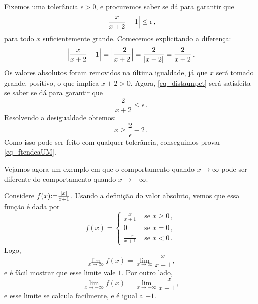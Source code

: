 \begin{ex}
Fixemos uma tolerância 
$\epsilon>0$, e procuremos saber se dá para garantir que 
\begin{equation}\label{eq_distaunpet} 
\Bigl|\frac{x}{x+2}-1\Bigr|\leq \epsilon\,,
\end{equation}
para todo $x$ suficientemente grande.
Comecemos explicitando a diferença:
\begin{equation}\label{eq_calculdifff}\Bigl|\frac{x}{x+2}-1\Bigr|=
\Bigl| \frac{-2}{x+2}\Bigr|=\frac{2}{|x+2|}=\frac{2}{x+2}\,.
\end{equation}
Os valores absolutos foram removidos na última igualdade,
já que $x$ será tomado grande, positivo, o que
implica $x+2>0$.
Agora, \eqref{eq_distaunpet} será satisfeita se
saber se dá para garantir que 
\[ 
\frac{2}{x+2}\leq \epsilon\,.
\]
Resolvendo a desigualdade obtemos: 
\[x\geq \frac{2}{\epsilon}-2\,.\]
Como isso pode ser feito com qualquer tolerância,
conseguimos provar \eqref{eq_ftendeaUM}.
\end{ex}

Vejamos agora um exemplo em que o comportamento quando $x\to\infty$ pode
ser diferente do comportamento quando $x\to-\infty$.

\begin{ex}\label{ex_LIM_deuxassymp}
Considere $f(x){:=} \frac{|x|}{x+1}$.
Usando a definição do valor absoluto, vemos que essa função é dada por
\[ 
f(x)=
\begin{cases}
\frac{x}{x+1}&\text{ se }x\geq 0\,,\\
0&\text{ se }x= 0\,,\\
\frac{-x}{x+1}&\text{ se }x< 0\,.
\end{cases}
\]
Logo,
$$\lim_{x\to \infty}f(x)=\lim_{x\to\infty}\frac{x}{x+1}\,,
$$
e é fácil mostrar que esse limite vale $1$.
Por outro lado,
$$\lim_{x\to -\infty}f(x)=\lim_{x\to-\infty}\frac{-x}{x+1}\,,
$$
e esse limite se calcula facilmente, e é igual a $-1$.
\begin{center}
\begin{bmlimage}\end{bmlimage}
\end{center}
\end{ex}

